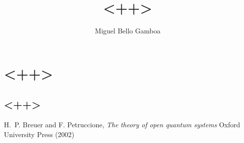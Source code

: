 \documentclass[11pt,a4paper]{article}
\begin{document}
\title{<++>}
\author{Miguel Bello Gamboa}
\maketitle

\section{<++>}
\subsection{<++>}


\begin{thebibliography}{4}
 
   H.~P. Breuer and F. Petruccione,
 \textit{The theory of open quantum systems}
 Oxford University Press (2002)
 
\end{thebibliography} 
\end{document}
